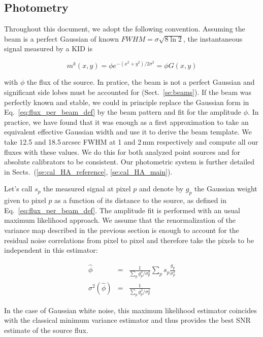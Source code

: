 \subsection{Photometry}
\label{se:intro_photometry}

Throughout this document, we adopt the following convention. Assuming the beam
is a perfect Gaussian of known $FWHM=\sigma\sqrt{8\ln 2}$, the instantaneous
signal measured by a KID is

\begin{equation}
m^k(x,y) = \phi e^{-(x^2+y^2)/2\sigma^2} = \phi G(x,y)
\label{eq:flux_per_beam_def}
\end{equation}

with $\phi$ the flux of the source. In pratice, the beam is not a perfect
Gaussian and significant side lobes must be accounted for
(Sect.~\ref{se:beams}). If the beam was perfectly known and stable, we could in
principle replace the Gaussian form in Eq.~\ref{eq:flux_per_beam_def} by the
beam pattern and fit for the amplitude $\phi$. In practice, we have found that
it was enough as a first approximation to take an equivalent effective Gaussian
width and use it to derive the beam template. We take 12.5 and 18.5\,arcsec FWHM
at 1 and 2\,mm respectively and compute all our fluxes with these
values. We do this for both analyzed point sources and for absolute calibrators
to be consistent. Our photometric system is further detailed in
Sects.~(\ref{se:cal_HA_reference}, \ref{se:cal_HA_main}). 

Let's call $s_p$ the measured signal at pixel $p$ and denote by $g_p$ the
Gaussian weight given to pixel $p$ as a function of its distance to the source,
as defined in Eq.~\ref{eq:flux_per_beam_def}. The amplitude fit is performed
with an usual maximum likelihood approach. We assume that the renormalization of
the variance map described in the previous section is enough to account for the
residual noise correlations from pixel to pixel and therefore take the pixels to
be independent in this estimator:

\begin{eqnarray}
\hat{\phi} &=& \frac{1}{\sum_p g_p^2/\sigma_p^2}\sum_p
s_p\frac{g_p}{\sigma_p^2} \label{eq:flux_estim_def} \\
\sigma^2(\hat{\phi}) &=& \frac{1}{\sum_p
  g_p^2/\sigma_p^2} \label{eq:flux_estim_var_def}
\end{eqnarray}

In the case of Gaussian white noise, this maximum likelihood estimator coincides
with the classical minimum variance estimator and thus provides the best SNR
estimate of the source flux.

